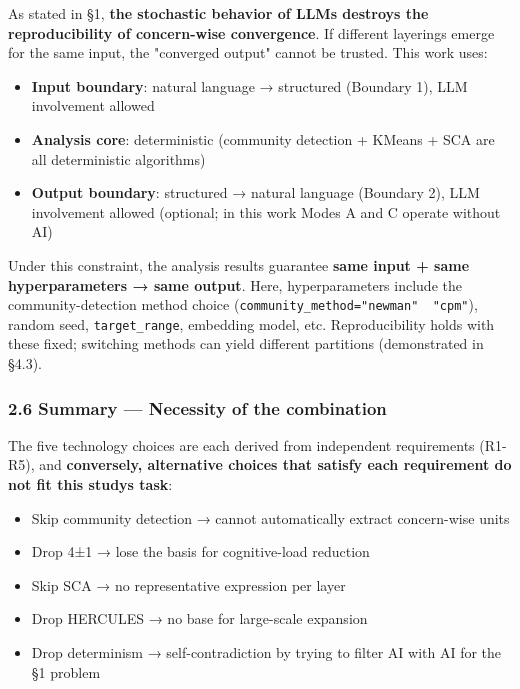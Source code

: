 \documentclass[
]{article}
\providecommand{\tightlist}{%
  \setlength{\itemsep}{0pt}\setlength{\parskip}{0pt}}
\begin{document}
As stated in §1, \textbf{the stochastic behavior of LLMs destroys the
reproducibility of concern-wise convergence}. If different layerings
emerge for the same input, the "converged output" cannot be trusted.
This work uses:

\begin{itemize}
\tightlist
\item
  \textbf{Input boundary}: natural language → structured (Boundary 1),
  LLM involvement allowed
\item
  \textbf{Analysis core}: deterministic (community detection + KMeans +
  SCA are all deterministic algorithms)
\item
  \textbf{Output boundary}: structured → natural language (Boundary 2),
  LLM involvement allowed (optional; in this work Modes A and C operate
  without AI)
\end{itemize}

Under this constraint, the analysis results guarantee \textbf{same input
+ same hyperparameters → same output}. Here, hyperparameters include the
community-detection method choice
(\texttt{community\_method="newman"\ \textbar{}\ "cpm"}), random seed,
\texttt{target\_range}, embedding model, etc. Reproducibility holds with
these fixed; switching methods can yield different partitions
(demonstrated in §4.3).

\subsubsection{2.6 Summary --- Necessity of the
combination}\label{26-summary--necessity-of-the-combination}

The five technology choices are each derived from independent
requirements (R1-R5), and \textbf{conversely, alternative choices that
satisfy each requirement do not fit this study\textquotesingle s task}:

\begin{itemize}
\tightlist
\item
  Skip community detection → cannot automatically extract concern-wise
  units
\item
  Drop 4±1 → lose the basis for cognitive-load reduction
\item
  Skip SCA → no representative expression per layer
\item
  Drop HERCULES → no base for large-scale expansion
\item
  Drop determinism → self-contradiction by trying to filter AI with AI
  for the §1 problem
\end{itemize}
\end{document}
